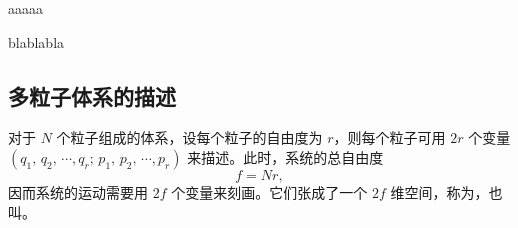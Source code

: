 		\begin{myExample}[一维谐振子]
			aaaaa
		\end{myExample}
		
		\begin{myExample}[转子]
			blablabla
		\end{myExample}%
		
	\subsection{多粒子体系的描述}
		对于 $N$ 个粒子组成的体系，设每个粒子的自由度为 $r$，则每个粒子可用 $2r$ 个变量 $(q_1, \, q_2, \, \cdots, q_r; \allowbreak \, p_1, \, p_2, \, \cdots, p_r)$ 来描述。此时，系统的总自由度 %
		\begin{equation}
			f = Nr \comma
		\end{equation}
		因而系统的运动需要用 $2f$ 个变量来刻画。它们张成了一个 $2f$ 维空间，称为，也叫。

\raggedbottom%
\pagebreak
